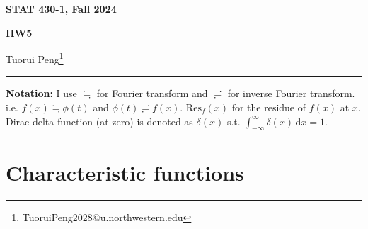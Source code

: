 \documentclass[11pt,a4paper]{article}
\numberwithin{equation}{section}%
\begin{document}
\begin{center}\thispagestyle{plain}

{\LARGE\textbf{STAT 430-1, Fall 2024}}

{\Large\textbf{HW5}}

Tuorui Peng\footnote{TuoruiPeng2028@u.northwestern.edu}
\end{center}

\thispagestyle{myheadings}
\pagestyle{myheadings}

\setcounter{tocdepth}{1}
\tableofcontents

  





\vspace{12pt}


\hrule
\vspace{12pt}

\textbf{Notation:} I use $ \fallingdotseq $ for Fourier transform and $ \risingdotseq $ for inverse Fourier transform. i.e. $ f(x)\fallingdotseq \phi (t) $ and $ \phi (t)\risingdotseq f(x) $. $ \mathrm{ Res }_f(x)  $ for the residue of $ f(x) $ at $ x $. Dirac delta function (at zero) is denoted as $ \delta (x) $ s.t. $ \int_{-\infty}^\infty \delta (x) \,\mathrm{d}x=1 $.



\section{Characteristic functions}
\end{document}
